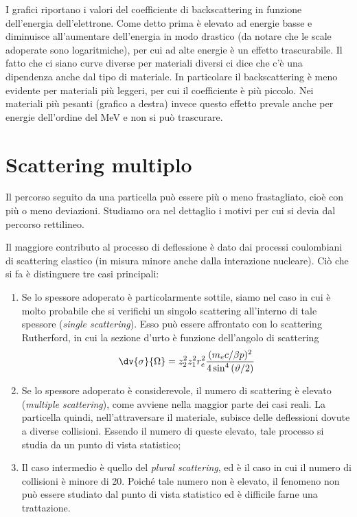 I grafici riportano i valori del coefficiente di backscattering in funzione dell'energia dell'elettrone. Come detto prima è elevato ad energie basse e diminuisce all'aumentare dell'energia in modo drastico (da notare che le scale adoperate sono logaritmiche), per cui ad alte energie è un effetto trascurabile. Il fatto che ci siano curve diverse per materiali diversi ci dice che c'è una dipendenza anche dal tipo di materiale. In particolare il backscattering è meno evidente per materiali più leggeri, per cui il coefficiente è più piccolo. Nei materiali più pesanti (grafico a destra) invece questo effetto prevale anche per energie dell'ordine del MeV e non si può trascurare.

\section{Scattering multiplo}

Il percorso seguito da una particella può essere più o meno frastagliato, cioè con più o meno deviazioni. Studiamo ora nel dettaglio i motivi per cui si devia dal percorso rettilineo.

Il maggiore contributo al processo di deflessione è dato dai processi coulombiani di scattering elastico (in misura minore anche dalla interazione nucleare). Ciò che si fa è distinguere tre casi principali:

\begin{enumerate}[leftmargin=0.55cm]
    \item Se lo spessore adoperato è particolarmente sottile, siamo nel caso in cui è molto probabile che si verifichi un singolo scattering all'interno di tale spessore (\textit{single scattering}). Esso può essere affrontato con lo scattering Rutherford, in cui la sezione d'urto è funzione dell'angolo di scattering
    \begin{equation*}
        \dv{\sigma}{\Omega}=z_2^2 z_1^2 r_e^2 \frac{(m_ec/\beta p)^2}{4 \sin^4{(\vartheta/2)}}
    \end{equation*}
    \item Se lo spessore adoperato è considerevole, il numero di scattering è elevato (\textit{multiple scattering}), come avviene nella maggior parte dei casi reali. La particella quindi, nell'attraversare il materiale, subisce delle deflessioni dovute a diverse collisioni. Essendo il numero di queste elevato, tale processo si studia da un punto di vista statistico;
    \item Il caso intermedio è quello del \textit{plural scattering}, ed è il caso in cui il numero di collisioni è minore di 20. Poiché tale numero non è elevato, il fenomeno non può essere studiato dal punto di vista statistico ed è difficile farne una trattazione.
\end{enumerate}

